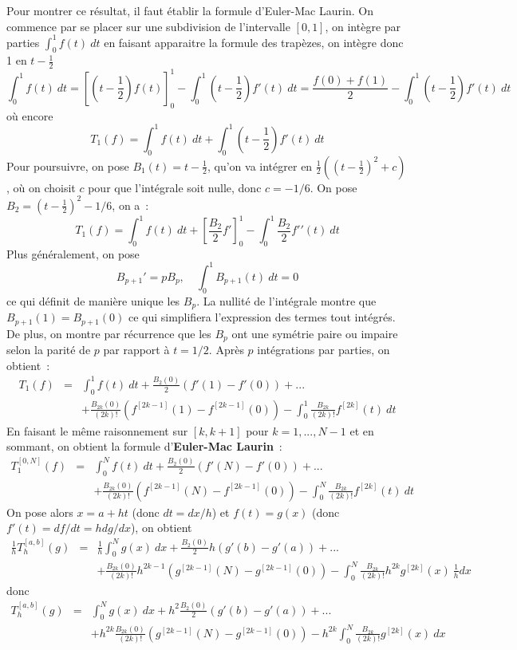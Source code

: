 \documentclass[a4paper,11pt]{article}
\begin{document}
\begin{giacjshere}
Pour montrer ce résultat, il faut établir la formule d'Euler-Mac
Laurin. On commence par se placer sur une subdivision de l'intervalle
$[0,1]$, on intègre par parties $\int_0^1 f(t)\ dt$ en faisant apparaitre
la formule des trapèzes, on intègre donc 1 en $t-\frac{1}{2}$
$$ \int_0^1 f(t) \ dt = 
[(t-\frac{1}{2})f(t)]_0^1 - \int_0^1 (t-\frac{1}{2})f'(t) \ dt =
\frac{f(0)+f(1)}{2} - \int_0^1 (t-\frac{1}{2})f'(t) \ dt
$$
où encore
$$ T_1(f)=\int_0^1 f(t) \ dt 
+  \int_0^1 (t-\frac{1}{2})f'(t) \ dt $$
Pour poursuivre, on pose $B_1(t)=t-\frac{1}{2}$, qu'on va intégrer
en $\frac{1}{2}((t-\frac{1}{2})^2+c)$, où on choisit $c$ pour que l'intégrale
soit nulle, donc $c=-1/6$. On pose $B_2=(t-\frac{1}{2})^2-1/6$, on a~:
$$  T_1(f)=\int_0^1 f(t) \ dt 
+ [\frac{B_2}{2} f']_0^1 - \int_0^1 \frac{B_2}{2}f'{'}(t) \ dt 
$$
Plus
généralement, on pose
$$ B_{p+1}'=pB_p, \quad \int_0^1 B_{p+1}(t) \ dt=0 $$
ce qui définit de manière unique les $B_p$. La nullité de l'intégrale
montre que $B_{p+1}(1)=B_{p+1}(0)$ ce qui simplifiera l'expression des
termes tout intégrés. De plus, on montre par récurrence
que les $B_p$ ont une symétrie paire
ou impaire selon la parité de $p$ par rapport à $t=1/2$.
Après $p$ intégrations par parties, on obtient~:
\begin{eqnarray*}
  T_1(f)&=&\int_0^1 f(t) \ dt 
+ \frac{B_2(0)}{2} (f'(1)-f'(0)) 
+ ... \\
& &+ \frac{B_{2k}(0)}{(2k)!} (f^{[2k-1]}(1)-f^{[2k-1]}(0)) 
- \int_0^1 \frac{B_{2k}}{(2k)!} f^{[2k]}(t) \ dt 
\end{eqnarray*}
En faisant le même raisonnement sur $[k,k+1]$ pour $k=1,...,N-1$
et en sommant, on obtient la formule 
d'{\bf Euler-Mac Laurin}~:
\begin{eqnarray*}
  T_1^{[0,N]}(f)&=&\int_0^N f(t) \ dt 
+ \frac{B_2(0)}{2} (f'(N)-f'(0)) 
+ ... \\
& & + \frac{B_{2k}(0)}{(2k)!} (f^{[2k-1]}(N)-f^{[2k-1]}(0)) 
- \int_0^N \frac{B_{2k}}{(2k)!} f^{[2k]}(t) \ dt 
\end{eqnarray*}
On pose alors $x=a+ht$ (donc $dt=dx/h$) et $f(t)=g(x)$
(donc $f'(t)=df/dt=h dg/dx$), on obtient 
\begin{eqnarray*}
 \frac1h T_h^{[a,b]}(g)&=& \frac1h \int_0^N g(x) \ dx 
+ \frac{B_2(0)}{2} h(g'(b)-g'(a)) 
+ ... \\
& &+ \frac{B_{2k}(0)}{(2k)!} h^{2k-1} (g^{[2k-1]}(N)-g^{[2k-1]}(0)) 
- \int_0^N \frac{B_{2k}}{(2k)!} h^{2k} g^{[2k]}(x) \ \frac1h dx 
\end{eqnarray*}
donc
\begin{eqnarray*}
 T_h^{[a,b]}(g) &=&  \int_0^N g(x) \ dx 
+ h^2 \frac{B_2(0)}{2} (g'(b)-g'(a)) 
+ ... \\
& & + h^{2k} \frac{B_{2k}(0)}{(2k)!}  (g^{[2k-1]}(N)-g^{[2k-1]}(0)) 
- h^{2k} \int_0^N \frac{B_{2k}}{(2k)!}  g^{[2k]}(x) \  dx 
\end{eqnarray*}


\end{giacjshere}
\end{document}
